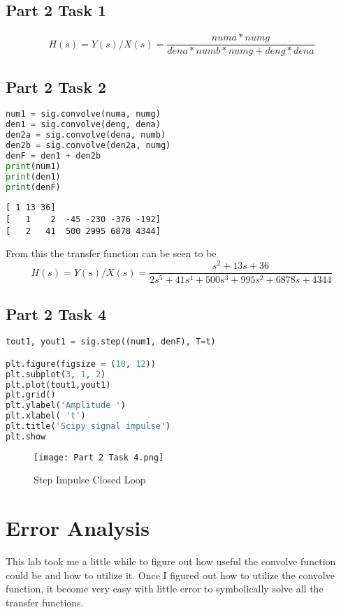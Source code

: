 \documentclass[11pt,a4]{report}
\begin{document}
\subsection{Part 2 Task 1}

\begin{equation}
    H(s) = Y(s)/X(s) = \frac{numa*numg}{dena*numb*numg+deng*dena}
\end{equation}

\subsection{Part 2 Task 2}
\begin{lstlisting}[language=Python]
num1 = sig.convolve(numa, numg)
den1 = sig.convolve(deng, dena) 
den2a = sig.convolve(dena, numb)
den2b = sig.convolve(den2a, numg)
denF = den1 + den2b
print(num1)
print(den1)
print(denF)
\end{lstlisting}

\begin{lstlisting}
[ 1 13 36]
[   1    2  -45 -230 -376 -192]
[   2   41  500 2995 6878 4344]
\end{lstlisting}
From this the transfer function can be seen to be
\begin{equation}
    H(s) = Y(s)/X(s) = \frac{s^2+13s+36}{2s^5+41s^4+500s^3+995s^2+6878s+ 4344}
\end{equation}


\subsection{Part 2 Task 4}
\begin{lstlisting}[language=Python]
tout1, yout1 = sig.step((num1, denF), T=t)

plt.figure(figsize = (10, 12))
plt.subplot(3, 1, 2)
plt.plot(tout1,yout1)
plt.grid()
plt.ylabel('Amplitude ')
plt.xlabel( 't')
plt.title('Scipy signal impulse')
plt.show
\end{lstlisting}

\begin{figure}[h!]
    \begin{center}
  \caption{Step Impulse Closed Loop}
  \texttt{[image: Part 2 Task 4.png]}
\end{center}
\end{figure}





\section{Error Analysis}
This lab took me a little while to figure out how useful the convolve function could be and how to utilize it. Once I figured out how to utilize the convolve function, it become very easy with little error to symbolically solve all the transfer functions. 
\end{document}
